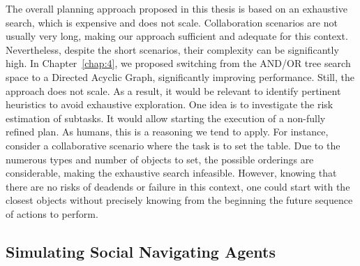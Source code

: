 
The overall planning approach proposed in this thesis is based on an exhaustive search, which is expensive and does not scale. Collaboration scenarios are not usually very long, making our approach sufficient and adequate for this context. Nevertheless, despite the short scenarios, their complexity can be significantly high. In Chapter~\ref{chap:4}, we proposed switching from the AND/OR tree search space to a Directed Acyclic Graph, significantly improving performance. Still, the approach does not scale. As a result, it would be relevant to identify pertinent heuristics to avoid exhaustive exploration. One idea is to investigate the risk estimation of subtasks. It would allow starting the execution of a non-fully refined plan. As humans, this is a reasoning we tend to apply. For instance, consider a collaborative scenario where the task is to set the table. Due to the numerous types and number of objects to set, the possible orderings are considerable, making the exhaustive search infeasible. However, knowing that there are no risks of deadends or failure in this context, one could start with the closest objects without precisely knowing from the beginning the future sequence of actions to perform.  

\subsection*{Simulating Social Navigating Agents}



